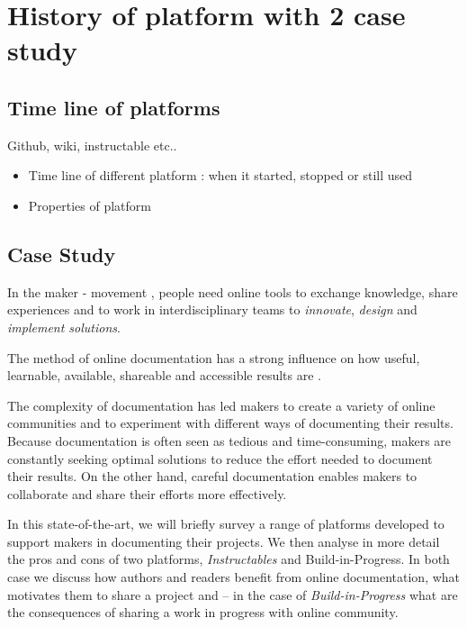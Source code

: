 \chapter{History of platform with 2 case study}

\section{Time line of platforms}
Github, wiki, instructable etc..




\begin{itemize}
	\item Time line of different platform : when it started, stopped or still used
	\item Properties of platform
\end{itemize}

\section{ Case Study}



In the maker - movement \cite{davies2017hackerspaces}, people need online tools to exchange knowledge, share experiences and to work in interdisciplinary teams to \textit{innovate}, \textit{design} and \textit{implement solutions}.

The method of online documentation has a strong influence on how useful, learnable, available, shareable and accessible results are \cite{harcourt2016re}.

The complexity of documentation has led makers to create a variety of online communities and to experiment with different ways of documenting their results. Because documentation is often seen as tedious and time-consuming, makers are constantly seeking optimal solutions to reduce the effort needed to document their results. On the other hand, careful documentation enables makers to collaborate and share their efforts more effectively.


In this state-of-the-art, we will briefly survey a range of platforms developed to support makers in documenting their projects. We then analyse in more detail the pros and cons of two platforms, \textit{Instructables} and Build-in-Progress. In both case we discuss how authors and readers benefit from online documentation, what motivates them to share a project and – in the case of \textit{Build-in-Progress} what are the consequences of sharing a work in progress with online community.

